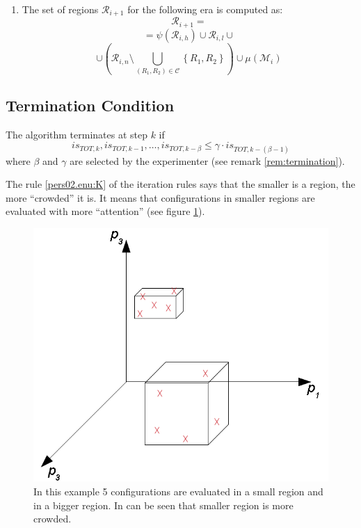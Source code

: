 \begin{enumerate}
\item The set of regions $\mathcal{R}_{i+1}$ for the following era is computed as:
	\[
	\mathcal{R}_{i+1}=
	\]
	\[
	=\psi\left(\mathscr{R}_{i,h}\right) \cup \mathcal{R}_{i,l}\cup
	\]
	\[
	\cup\left(\mathcal{R}_{i,n}\setminus\bigcup_{\left(R_{1},R_{2}\right)\in\mathcal{C}}\left\{ R_{1},R_{2}\right\} \right)\cup \mu(\mathscr{M}_i)
	\]
\end{enumerate}




\subsection{Termination Condition}
The algorithm terminates at step $k$ if
\[
is_{TOT,k},is_{TOT,k-1},\dots,is_{TOT,k-\beta}\le\gamma\cdot is_{TOT,k-\left(\beta-1\right)}
\]
 where $\beta$ and $\gamma$ are selected by the experimenter (see
remark \ref{rem:termination}).
\begin{remark}
\label{pers02.rem:smaller_regions}The rule \ref{pers02.enu:K} of
the iteration rules says that the smaller is a region, the more ``crowded''
it is. It means that configurations in smaller regions are evaluated
with more ``attention'' (see figure \ref{pers02.fig:small_and_big}).

\begin{figure}[h]
\includegraphics[width=0.5\columnwidth]{img/small_and_big}

\caption{\label{pers02.fig:small_and_big}In this example 5 configurations
are evaluated in a small region and in a bigger region. In can be
seen that smaller region is more crowded.}


\end{figure}

\end{remark}

